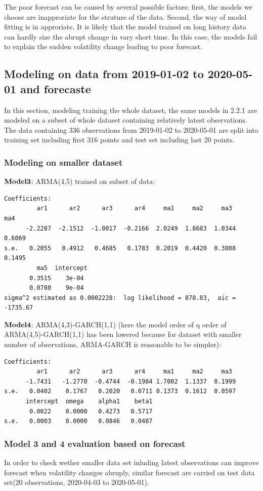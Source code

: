 \documentclass [letterpaper] {article}
\begin{document}
The poor forecast can be caused by several possible factors: first, the models we choose are  inapproriate for the struture of the data. Second, the way of model fitting is in approriate. It is likely that the model trained on long history data can hardly size the abrupt change in vary short time. In this case, the models fail to explain the sudden volatility change leading to poor forecast. 

\subsection{Modeling  on data from 2019-01-02 to 2020-05-01 and forecaste}
In this section, modeling training the whole dataset, the same models in 2.2.1 are modeled on a subset of whole dataset containing relatively latest observations. The data containing 336 observations from 2019-01-02 to 2020-05-01 are split into training set including first 316 points and test set including last 20 points.\\
\subsubsection{Modeling on smaller dataset}
$\bold{Model 3}$: ARMA(4,5) trained on  subset of data:

\begin{lstlisting}
Coefficients:
         ar1      ar2      ar3      ar4     ma1     ma2     ma3     ma4     
      -2.2287  -2.1512  -1.0017  -0.2166  2.0249  1.8683  1.0344  0.6069  
s.e.   0.2055   0.4912   0.4685   0.1783  0.2019  0.4420  0.3808  0.1495  
         ma5  intercept
       0.3515    3e-04
       0.0780    9e-04
sigma^2 estimated as 0.0002228:  log likelihood = 878.83,  aic = -1735.67
\end{lstlisting}	


$\bold{Model 4}$: ARMA(4,3)-GARCH(1,1) (here the model order of q order of ARMA(4,5)-GARCH(1,1) has been lowered because for dataset with smaller number of observations, ARMA-GARCH is reasonable to be simpler):
\begin{lstlisting}
Coefficients:
         ar1      ar2      ar3      ar4     ma1     ma2     ma3     
      -1.7431   -1.2770  -0.4744  -0.1984 1.7002  1.1337  0.1999
s.e.   0.0402    0.1767   0.2020   0.0711 0.1373  0.1612  0.0597
      intercept  omega    alpha1    beta1
       0.0022    0.0000   0.4273   0.5717
s.e.   0.0003    0.0000   0.0846   0.0487
\end{lstlisting}
	

\subsubsection{Model 3 and 4 evaluation based on forecast}
In order to check wether smaller data set inluding  latest observations can improve forecast when volatility changes abruply, similar forecast are carried on test data set(20 observations, 2020-04-03 to 2020-05-01).
\end{document}
